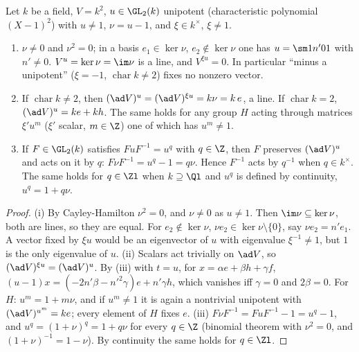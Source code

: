 \begin{proposition}\label{prop:reps:unipotent-invariants}
Let $k$ be a field, $V=k^2$, $u\in\GL_2(k)$ unipotent (characteristic polynomial $(X-1)^2$) with $u\ne1$, $\nu=u-1$, and $\xi\in k^\times$, $\xi\ne1$.
\begin{enumerate}[label=(\roman*)]
\item $\nu\ne0$ and $\nu^2=0$; in a basis $e_1\in\ker\nu$, $e_2\notin\ker\nu$ one has $u=\sm1{n'}01$ with $n'\ne0$. $V^u=\ker\nu=\im\nu$ is a line, and $V^{\xi u}=0$. In
particular ``minus a unipotent'' ($\xi=-1$, $\operatorname{char}k\ne2$) fixes no nonzero vector.
\item If $\operatorname{char}k\ne2$, then $(\ad V)^u=(\ad V)^{\xi u}=k\nu=k\,e$, a line. If $\operatorname{char}k=2$, $(\ad V)^u=ke+kh$. The same holds for any group $H$ acting
through matrices $\xi'u^m$ ($\xi'$ scalar, $m\in\Z$) one of which has $u^m\ne1$.
\item If $F\in\GL_2(k)$ satisfies $FuF^{-1}=u^q$ with $q\in\Z$, then $F$ preserves $(\ad V)^u$ and acts on it by $q$: $F\nu F^{-1}=u^q-1=q\nu$. Hence $F^{-1}$ acts by
$q^{-1}$ when $q\in k^\times$. The same holds for $q\in\Zl$ when $k\supseteq\Ql$ and $u^q$ is defined by continuity, $u^q=1+q\nu$.
\end{enumerate}
\end{proposition}

\begin{proof}
(i) By Cayley-Hamilton $\nu^2=0$, and $\nu\ne0$ as $u\ne1$. Then $\im\nu\subseteq\ker\nu$, both are lines, so they are equal. For $e_2\notin\ker\nu$,
$\nu e_2\in\ker\nu\setminus\{0\}$, say $\nu e_2=n'e_1$. A vector fixed by $\xi u$ would be an eigenvector of $u$ with eigenvalue $\xi^{-1}\ne1$, but $1$ is the only
eigenvalue of $u$.
(ii) Scalars act trivially on $\ad V$, so $(\ad V)^{\xi u}=(\ad V)^u$. By (iii) with $t=u$, for $x=\alpha e+\beta h+\gamma f$,
$(u-1)x=(-2n'\beta-n'^2\gamma)e+n'\gamma h$, which vanishes iff $\gamma=0$ and $2\beta=0$. For $H$: $u^m=1+m\nu$, and if $u^m\ne1$ it is again a nontrivial
unipotent with $(\ad V)^{u^m}=ke$; every element of $H$ fixes $e$.
(iii) $F\nu F^{-1}=FuF^{-1}-1=u^q-1$, and $u^q=(1+\nu)^q=1+q\nu$ for every $q\in\Z$ (binomial theorem with $\nu^2=0$, and $(1+\nu)^{-1}=1-\nu$). By continuity the
same holds for $q\in\Zl$.
\end{proof}

